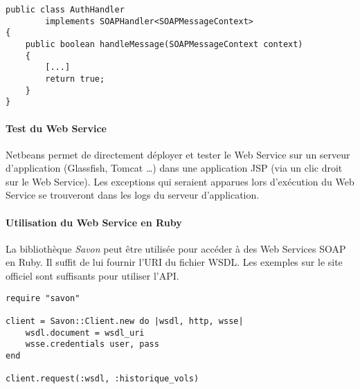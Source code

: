 \documentclass[a4paper,12pt,french]{article}
\begin{document}
\begin{lstlisting}
public class AuthHandler
        implements SOAPHandler<SOAPMessageContext>
{
    public boolean handleMessage(SOAPMessageContext context)
    {
        [...]
        return true;
    }
}
\end{lstlisting}

\paragraph{Test du Web Service}
Netbeans permet de directement déployer et tester le Web Service sur un
serveur d'application (Glassfish, Tomcat \dots{}) dans une application JSP
(via un clic droit sur le Web Service). Les exceptions qui seraient apparues
lors d'exécution du Web Service se trouveront dans les logs du serveur
d'application.

\paragraph{Utilisation du Web Service en Ruby}
La bibliothèque \textit{Savon} peut être utilisée pour accéder à des Web
Services SOAP en Ruby. Il suffit de lui fournir l'URI du fichier WSDL. Les
exemples sur le site officiel sont suffisants pour utiliser l'API.

\begin{lstlisting}
require "savon"

client = Savon::Client.new do |wsdl, http, wsse|
    wsdl.document = wsdl_uri
    wsse.credentials user, pass
end

client.request(:wsdl, :historique_vols)
\end{lstlisting}
\end{document}
